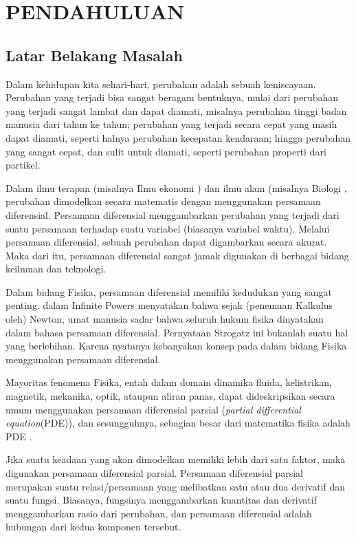 \chapter{PENDAHULUAN}
\setcounter{page}{1}
\section{Latar Belakang Masalah}\label{latarbelakang}
Dalam kehidupan kita sehari-hari, perubahan adalah sebuah keniscayaan. Perubahan yang terjadi bisa sangat beragam bentuknya, mulai dari perubahan yang terjadi sangat lambat dan dapat diamati, misalnya perubahan tinggi badan manusia dari tahun ke tahun; perubahan yang terjadi secara cepat yang masih dapat diamati, seperti halnya perubahan kecepatan kendaraan; hingga perubahan yang sangat cepat, dan sulit untuk diamati, seperti perubahan properti dari partikel.

Dalam ilmu terapan (misalnya Ilmu ekonomi \citep{norberg_1995}) dan ilmu alam (misalnya Biologi \citep{culshaw_ruan_2000}, perubahan dimodelkan secara matematis dengan menggunakan persamaan diferensial. Persamaan diferensial menggambarkan perubahan yang terjadi dari suatu persamaan terhadap suatu variabel (biasanya variabel waktu). Melalui persamaan diferensial, sebuah perubahan dapat digambarkan secara akurat. Maka dari itu, persamaan diferensial sangat jamak digunakan di berbagai bidang keilmuan dan teknologi. 

Dalam bidang Fisika, persamaan diferensial memiliki kedudukan yang sangat penting. \cite{strogatz_2020_infinite} dalam Infinite Powers menyatakan bahwa sejak (penemuan Kalkulus oleh) Newton, umat manusia sadar bahwa seluruh hukum fisika dinyatakan dalam bahasa persamaan diferensial. Pernyataan Strogatz ini bukanlah suatu hal yang berlebihan. Karena nyatanya kebanyakan konsep pada dalam bidang Fisika menggunakan persamaan diferensial.

Mayoritas fenomena Fisika, entah dalam domain dinamika fluida, kelistrikan, magnetik, mekanika, optik, ataupun aliran panas, dapat dideskripsikan secara umum menggunakan persamaan diferensial parsial (\emph{partial differential equation}(PDE)), dan sesungguhnya, sebagian besar dari matematika fisika adalah PDE \citep{farlow_2012_partial}.

Jika suatu keadaan yang akan dimodelkan memiliki lebih dari satu faktor, maka digunakan persamaan diferensial parsial. Persamaan diferensial parsial merupakan suatu relasi/persamaan yang melibatkan satu atau dua derivatif dan suatu fungsi. Biasanya, fungsinya menggambarkan kuantitas dan derivatif menggambarkan rasio dari perubahan, dan persamaan diferensial adalah hubungan dari kedua komponen tersebut.  

